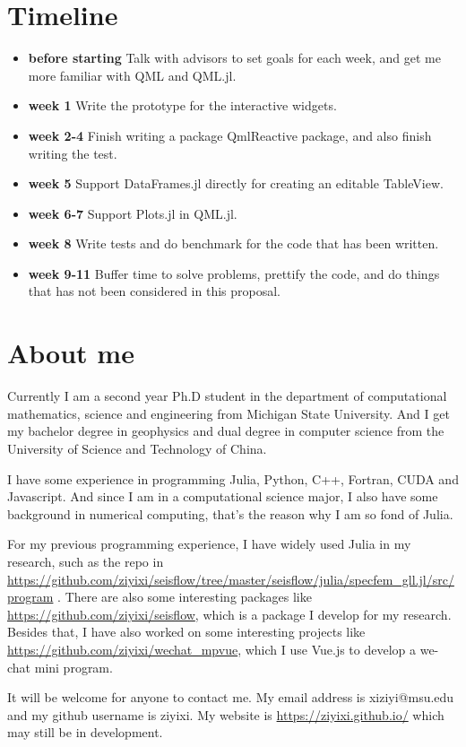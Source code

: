 \documentclass[12pt]{extarticle}
\begin{document}
\section{Timeline}
\begin{itemize}
    \item{\textbf{before starting}} Talk with advisors to set goals for each week, and get me more familiar with QML and QML.jl.
    \item{\textbf{week 1}} Write the prototype for the interactive widgets.
    \item{\textbf{week 2-4}} Finish writing a package QmlReactive package, and also finish writing the test.
    \item{\textbf{week 5}} Support DataFrames.jl directly for creating an editable TableView.
    \item{\textbf{week 6-7}} Support Plots.jl in QML.jl.
    \item{\textbf{week 8}} Write tests and do benchmark for the code that has been written.
    \item{\textbf{week 9-11}} Buffer time to solve problems, prettify the code, and do things that has not been considered in this proposal.
\end{itemize}


\section{About me}

Currently I am a second year Ph.D student in the department of computational mathematics, science and engineering from Michigan State University.
And I get my bachelor degree in geophysics and dual degree in computer science from the University of Science and Technology of China.

I have some experience in programming Julia, Python, C++, Fortran, CUDA and Javascript. And since I am in a computational science major, I also have some 
background in numerical computing, that's the reason why I am so fond of Julia.

For my previous programming experience, I have widely used Julia in my research, such as the repo in \url{https://github.com/ziyixi/seisflow/tree/master/seisflow/julia/specfem_gll.jl/src/program} .
There are also some interesting packages like \url{https://github.com/ziyixi/seisflow}, which is a package I develop for my research. Besides that, I have also worked on some
interesting projects like \url{https://github.com/ziyixi/wechat_mpvue}, which I use Vue.js to develop a we-chat mini program.

It will be welcome for anyone to contact me. My email address is xiziyi@msu.edu and my github username is ziyixi. My website is \url{https://ziyixi.github.io/} which may
still be in development. 
\end{document}

